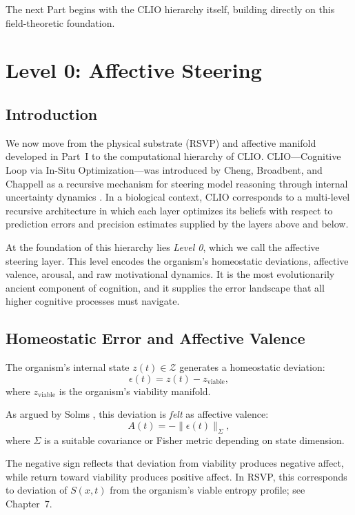 \documentclass[12pt,oneside]{book}
\theoremstyle{plain}
\theoremstyle{definition}
\let\citep\parencite
\begin{document}
The next Part begins with the CLIO hierarchy itself, building directly on
this field-theoretic foundation.

\chapter{Level 0: Affective Steering}

\section{Introduction}

We now move from the physical substrate (RSVP) and affective manifold
developed in Part~I to the computational hierarchy of CLIO.
CLIO---Cognitive Loop via In-Situ Optimization---was introduced by
Cheng, Broadbent, and Chappell as a recursive mechanism for steering
model reasoning through internal uncertainty dynamics
\citep{cheng2025cognitive}.
In a biological context, CLIO corresponds to a multi-level recursive
architecture in which each layer optimizes its beliefs with respect to
prediction errors and precision estimates supplied by the layers above
and below.

At the foundation of this hierarchy lies \emph{Level 0}, which we call
the affective steering layer.
This level encodes the organism’s homeostatic deviations, affective
valence, arousal, and raw motivational dynamics.
It is the most evolutionarily ancient component of cognition, and it
supplies the error landscape that all higher cognitive processes must
navigate.

\section{Homeostatic Error and Affective Valence}

The organism’s internal state $z(t)\in\mathcal{Z}$ generates a
homeostatic deviation:
\[
\epsilon(t) = z(t) - z_{\mathrm{viable}},
\]
where $z_{\mathrm{viable}}$ is the organism’s viability manifold.

As argued by Solms \citep{solms2021hidden}, this deviation is \emph{felt}
as affective valence:
\[
A(t) = -\|\epsilon(t)\|_{\Sigma},
\]
where $\Sigma$ is a suitable covariance or Fisher metric depending on
state dimension.

The negative sign reflects that deviation from viability produces
negative affect, while return toward viability produces positive affect.
In RSVP, this corresponds to deviation of $S(x,t)$ from the organism's
viable entropy profile; see Chapter~7.
\end{document}
